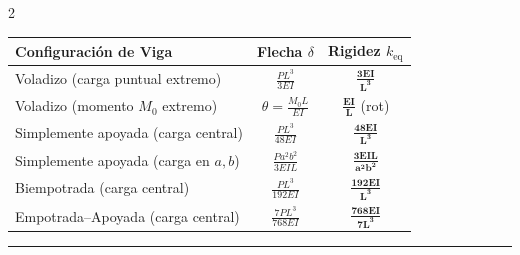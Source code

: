 \documentclass[10pt,a4paper]{article}
\begin{document}
\begin{multicols}{2}
\begin{center}
\renewcommand{\arraystretch}{1.2}
\scriptsize
\begin{tabular*}{\linewidth}{@{\extracolsep{\fill}}lcc@{}}
\toprule
\textbf{Configuración de Viga} & \textbf{Flecha $\delta$} & \textbf{Rigidez $k_{\text{eq}}$} \\
\midrule
Voladizo (carga puntual extremo) & $\frac{P L^3}{3EI}$ & $\mathbf{\frac{3EI}{L^3}}$ \\
Voladizo (momento $M_0$ extremo) & $\theta = \frac{M_0 L}{EI}$ & $\mathbf{\frac{EI}{L}}$ (rot) \\
Simplemente apoyada (carga central) & $\frac{PL^3}{48EI}$ & $\mathbf{\frac{48EI}{L^3}}$ \\
Simplemente apoyada (carga en $a,b$) & $\frac{Pa^2b^2}{3EIL}$ & $\mathbf{\frac{3EIL}{a^2 b^2}}$ \\
Biempotrada (carga central) & $\frac{PL^3}{192EI}$ & $\mathbf{\frac{192EI}{L^3}}$ \\
Empotrada--Apoyada (carga central) & $\frac{7PL^3}{768EI}$ & $\mathbf{\frac{768EI}{7L^3}}$ \\
\bottomrule
\end{tabular*}
\end{center}

\end{multicols}

\vspace{-1.5mm}
\noindent\textcolor{linegray}{\rule{\linewidth}{1pt}}
\vspace{-1mm}
\end{document}
